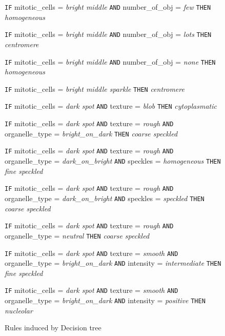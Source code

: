 \begin{figure}
	\caption{Rules induced by Decision tree }
	\label{fig:RulesDT}
	\footnotesize
	\centering
	
		\begin{algorithmic}[1]
			\State \texttt{IF} mitotic\_cells = \textit{bright middle} \texttt{AND} number\_of\_obj = \textit{few}
			\Statex \texttt{THEN} \textit{homogeneous}
			
			\State \texttt{IF} mitotic\_cells = \textit{bright middle} \texttt{AND} number\_of\_obj = \textit{lots}
			\Statex \texttt{THEN} \textit{centromere}
			
			\State \texttt{IF} mitotic\_cells = \textit{bright middle} \texttt{AND} number\_of\_obj = \textit{none}
			\Statex \texttt{THEN} \textit{homogeneous}
			
			\State \texttt{IF} mitotic\_cells = \textit{bright middle sparkle}
			\Statex \texttt{THEN} \textit{centromere}
			
			\State \texttt{IF} mitotic\_cells = \textit{dark spot} \texttt{AND} texture = \textit{blob}
			\Statex \texttt{THEN} \textit{cytoplasmatic}
			
			\State \texttt{IF} mitotic\_cells = \textit{dark spot} \texttt{AND} texture = \textit{rough} \texttt{AND} organelle\_type = \textit{bright\_on\_dark}
			\Statex \texttt{THEN} \textit{coarse speckled}
			
			\State \texttt{IF} mitotic\_cells = \textit{dark spot} \texttt{AND} texture = \textit{rough} \texttt{AND} organelle\_type = \textit{dark\_on\_bright} \texttt{AND} speckles = \textit{homogeneous}
			\Statex \texttt{THEN} \textit{fine speckled}
			
			\State \texttt{IF} mitotic\_cells = \textit{dark spot} \texttt{AND} texture = \textit{rough} \texttt{AND} organelle\_type = \textit{dark\_on\_bright} \texttt{AND} speckles = \textit{speckled}
			\Statex \texttt{THEN} \textit{coarse speckled}
			
			\State \texttt{IF} mitotic\_cells = \textit{dark spot} \texttt{AND} texture = \textit{rough} \texttt{AND} organelle\_type = \textit{neutral} 
			\Statex \texttt{THEN} \textit{coarse speckled}
			
			\State \texttt{IF} mitotic\_cells = \textit{dark spot} \texttt{AND} texture = \textit{smooth} \texttt{AND} organelle\_type = \textit{bright\_on\_dark} \texttt{AND} intensity = \textit{intermediate} 
			\Statex \texttt{THEN} \textit{fine speckled}
			
			\State \texttt{IF} mitotic\_cells = \textit{dark spot} \texttt{AND} texture = \textit{smooth} \texttt{AND} organelle\_type = \textit{bright\_on\_dark} \texttt{AND} intensity = \textit{positive} 
			\Statex \texttt{THEN} \textit{nucleolar}
			

\end{algorithmic}
\end{figure}
